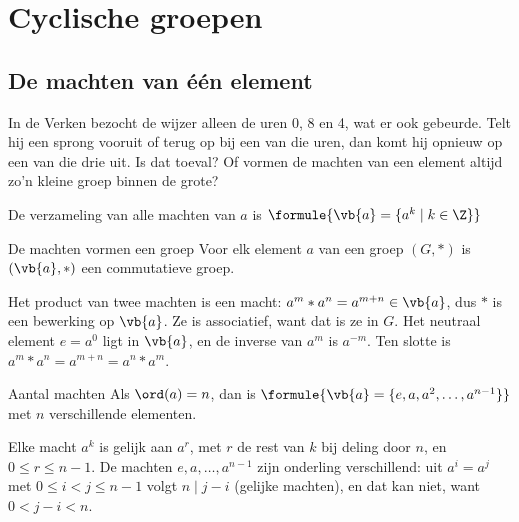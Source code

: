 \begin{oefeningen}

\end{oefeningen}

\section{Cyclische groepen}

\subsection{De machten van één element}

In de Verken bezocht de wijzer alleen de uren 0, 8 en 4, wat er ook gebeurde. Telt hij een sprong vooruit of terug op bij een van die uren, dan komt hij opnieuw op een van die drie uit. Is dat toeval? Of vormen de machten van een element altijd zo'n kleine groep binnen de grote?

\begin{theorie}
De verzameling van alle machten van $a$ is \qquad $\formule{\vb{a} = \{a^k \mid k \in \Z\}}$

\begin{stelling}{De machten vormen een groep}
Voor elk element $a$ van een groep $(G, \ast)$ is $(\vb{a}, \ast)$ een commutatieve groep.
\end{stelling}

\begin{bewijs}
Het product van twee machten is een macht: $a^m \ast a^n = a^{m + n} \in \vb{a}$, dus $\ast$ is een bewerking op $\vb{a}$. Ze is associatief, want dat is ze in $G$. Het neutraal element $e = a^0$ ligt in $\vb{a}$, en de inverse van $a^m$ is $a^{-m}$. Ten slotte is $a^m \ast a^n = a^{m + n} = a^n \ast a^m$.
\end{bewijs}
\end{theorie}

\begin{theorie}
\begin{stelling}{Aantal machten}
Als $\ord(a) = n$, dan is \qquad $\formule{\vb{a} = \{e, a, a^2, \ldots, a^{n - 1}\}}$ \qquad met $n$ verschillende elementen.
\end{stelling}

\begin{bewijs}
Elke macht $a^k$ is gelijk aan $a^r$, met $r$ de rest van $k$ bij deling door $n$, en $0 \leqslant r \leqslant n - 1$. De machten $e, a, \ldots, a^{n - 1}$ zijn onderling verschillend: uit $a^i = a^j$ met $0 \leqslant i < j \leqslant n - 1$ volgt $n \mid j - i$ (gelijke machten), en dat kan niet, want $0 < j - i < n$.
\end{bewijs}
\end{theorie}

